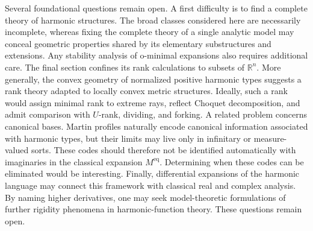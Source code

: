 \documentclass{amsart}
\theoremstyle{definition}
\theoremstyle{remark}
\numberwithin{equation}{section}
\begin{document}
Several foundational questions remain open. A first difficulty is to find a complete theory of harmonic structures. The broad classes considered here are necessarily incomplete, whereas fixing the complete theory of a single analytic model may conceal geometric properties shared by its elementary substructures and extensions. Any stability analysis of o-minimal expansions also requires additional care. The final section confines its rank calculations to subsets of $\mathbb R^n$. More generally, the convex geometry of normalized positive harmonic types suggests a rank theory adapted to locally convex metric structures. Ideally, such a rank would assign minimal rank to extreme rays, reflect Choquet decomposition, and admit comparison with $U$-rank, dividing, and forking. A related problem concerns canonical bases. Martin profiles naturally encode canonical information associated with harmonic types, but their limits may live only in infinitary or measure-valued sorts. These codes should therefore not be identified automatically with imaginaries in the classical expansion $M^{\mathrm{eq}}$. Determining when these codes can be eliminated would be interesting. Finally, differential expansions of the harmonic language may connect this framework with classical real and complex analysis. By naming higher derivatives, one may seek model-theoretic formulations of further rigidity phenomena in harmonic-function theory. These questions remain open.





\end{document}
